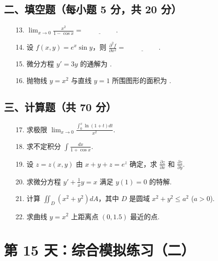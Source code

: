 \documentclass[11pt,a4paper]{article}
\begin{document}
\subsection*{二、填空题（每小题 5 分，共 20 分）}
\begin{enumerate}
    \item[13.] $\lim_{x \to 0} \frac{x^2}{1-\cos x} = \underline{\hspace{2cm}}$.
    \item[14.] 设 $f(x, y) = e^x \sin y$，则 $\frac{\partial^2 f}{\partial x^2} = \underline{\hspace{2cm}}$.
    \item[15.] 微分方程 $y' = 3y$ 的通解为 \underline{\hspace{2cm}}.
    \item[16.] 抛物线 $y = x^2$ 与直线 $y=1$ 所围图形的面积为 \underline{\hspace{2cm}}.
\end{enumerate}
\subsection*{三、计算题（共 70 分）}
\begin{enumerate}
    \item[17.] 求极限 $\lim_{x \to 0} \frac{\int_0^x \ln(1+t) dt}{x^2}$.
    \item[18.] 求不定积分 $\int \frac{dx}{1 + \cos x}$.
    \item[19.] 设 $z = z(x,y)$ 由 $x+y+z = e^z$ 确定，求 $\frac{\partial z}{\partial x}$ 和 $\frac{\partial z}{\partial y}$.
    \item[20.] 求微分方程 $y' + \frac{1}{x}y = x$ 满足 $y(1)=0$ 的特解.
    \item[21.] 计算 $\iint_D (x^2+y^2) dA$，其中 $D$ 是圆域 $x^2+y^2 \le a^2$ ($a>0$).
    \item[22.] 求曲线 $y = x^2$ 上距离点 $(0, 1.5)$ 最近的点.
\end{enumerate}

\newpage

\section*{第 15 天：综合模拟练习（二）}
\end{document}
